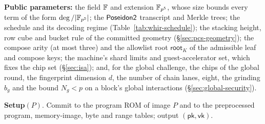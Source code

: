 \begin{protocol}
\label{prot:block}
\textbf{Public parameters:} the field $\mathbb{F}$ and extension $\mathbb{F}_{p^5}$, whose size bounds every term of the form $\deg/|\mathbb{F}_{p^5}|$; the $\mathsf{Poseidon2}{}$ transcript and Merkle trees; the \WHIR{} schedule and its decoding regime (Table~\ref{tab:whir-schedule}); the stacking height, row cube and bucket rule of the committed geometry (\S\ref{sec:pcs-geometry}); the compose arity (at most three) and the allowlist root $\mathsf{root}_K$ of the admissible leaf and compose keys; the machine's shard limits and guest-accelerator set, which fixes the chip set (\S\ref{sec:isa}); and, for the global challenge, the chips of the global round, the fingerprint dimension $d$, the number of chain lanes, eight, the grinding $b_g$ and the bound $N_g < p$ on a block's global interactions (\S\ref{sec:global-security}).

\smallskip
\noindent\textbf{Setup}$(P)$. Commit to the program ROM of image $P$ and to the preprocessed program, memory-image, byte and range tables; output $(\mathsf{pk}, \mathsf{vk})$.


\end{protocol}
